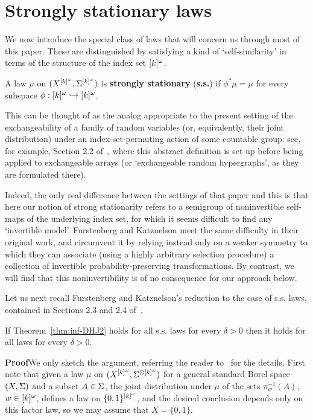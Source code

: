 \documentclass[11pt]{article}
\begin{document}
\section{Strongly stationary laws}

We now introduce the special class of laws that will concern us
through most of this paper.  These are distinguished by satisfying a
kind of `self-similarity' in terms of the structure of the index set
$[k]^\o$.

\begin{dfn}
A law $\mu$ on $(X^{[k]^\o},\S^{[k]^\o})$ is \textbf{strongly
stationary} (\textbf{s.s.}) if $\phi^\ast\mu = \mu$ for every
subspace $\phi:[k]^\o\into [k]^\o$.
\end{dfn}

This can be thought of as the analog appropriate to the present
setting of the exchangeability of a family of random variables (or,
equivalently, their joint distribution) under an index-set-permuting
action of some countable group: see, for example, Section 2.2
of~\cite{Aus--ERH}, where this abstract definition is set up before
being applied to exchangeable arrays (or `exchangeable random
hypergraphs', as they are formulated there).

Indeed, the only real difference between the settings of that paper
and this is that here our notion of strong stationarity refers to a
semigroup of noninvertible self-maps of the underlying index set,
for which it seems difficult to find any `invertible model'.
Furstenberg and Katznelson meet the same difficulty in their
original work, and circumvent it by relying instead only on a weaker
symmetry to which they can associate (using a highly arbitrary
selection procedure) a collection of invertible
probability-preserving transformations. By contrast, we will find
that this noninvertibility is of no consequence for our approach
below.

Let us next recall Furstenberg and Katznelson's reduction to the
case of s.s. laws, contained in Sections 2.3 and 2.4
of~\cite{FurKat91}.

\begin{lem}\label{lem:sssuffice}
If Theorem~\ref{thm:inf-DHJ2} holds for all s.s. laws for every
$\delta > 0$ then it holds for all laws for every $\delta > 0$.
\end{lem}

\textbf{Proof}\quad We only sketch the argument, referring the
reader to~\cite{FurKat91} for the details.  First note that given a law $\mu$ on $(X^{[k]^\o},\S^{\otimes [k]^\o})$ for a general standard Borel space $(X,\S)$ and a subset $A \in \S$, the joint distribution under $\mu$ of the sets $\pi_w^{-1}(A)$, $w \in [k]^\o$, defines a law on $\{0,1\}^{[k]^\o}$, and the desired conclusion depends only on this factor law, so we may assume that $X = \{0,1\}$.
\end{document}
